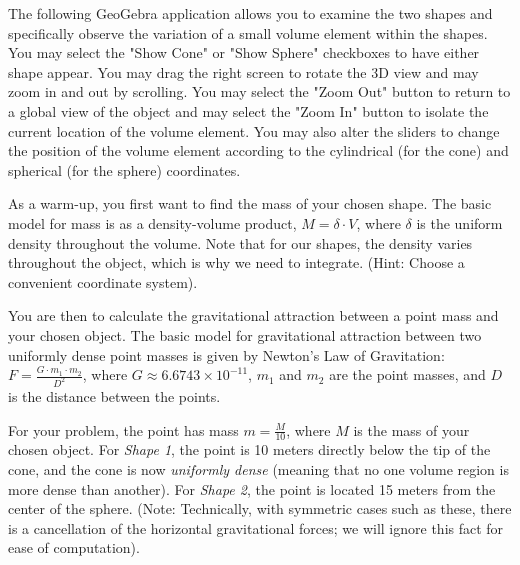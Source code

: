 \documentclass{ximera}
\begin{document}
\begin{center}
\end{center}

The following GeoGebra application allows you to examine the two shapes and specifically observe the variation of a small volume element within the shapes. You may select the "Show Cone" or "Show Sphere" checkboxes to have either shape appear. You may drag the right screen to rotate the 3D view and may zoom in and out by scrolling. You may select the "Zoom Out" button to return to a global view of the object and may select the "Zoom In" button to isolate the current location of the volume element. You may also alter the sliders to change the position of the volume element according to the cylindrical (for the cone) and spherical (for the sphere) coordinates.

\begin{center}
\end{center}

As a warm-up, you first want to find the mass of your chosen shape. The basic model for mass is as a density-volume product, $M=\delta\cdot V$, where $\delta$ is the uniform density throughout the volume. Note that for our shapes, the density varies throughout the object, which is why we need to integrate. (Hint: Choose a convenient coordinate system).

You are then to calculate the gravitational attraction between a point mass and your chosen object. The basic model for gravitational attraction between two uniformly dense point masses is given by Newton's Law of Gravitation: $F=\frac{G\cdot m_1\cdot m_2}{D^2}$, where $G\approx 6.6743\times 10^{-11}$, $m_1$ and $m_2$ are the point masses, and $D$ is the distance between the points.

For your problem, the point has mass $m=\frac{M}{10}$, where $M$ is the mass of your chosen object. For \textit{Shape 1}, the point is 10 meters directly below the tip of the cone, and the cone is now \textit{uniformly dense} (meaning that no one volume region is more dense than another). For \textit{Shape 2}, the point is located 15 meters from the center of the sphere. (Note: Technically, with symmetric cases such as these, there is a cancellation of the horizontal gravitational forces; we will ignore this fact for ease of computation).
\end{document}
